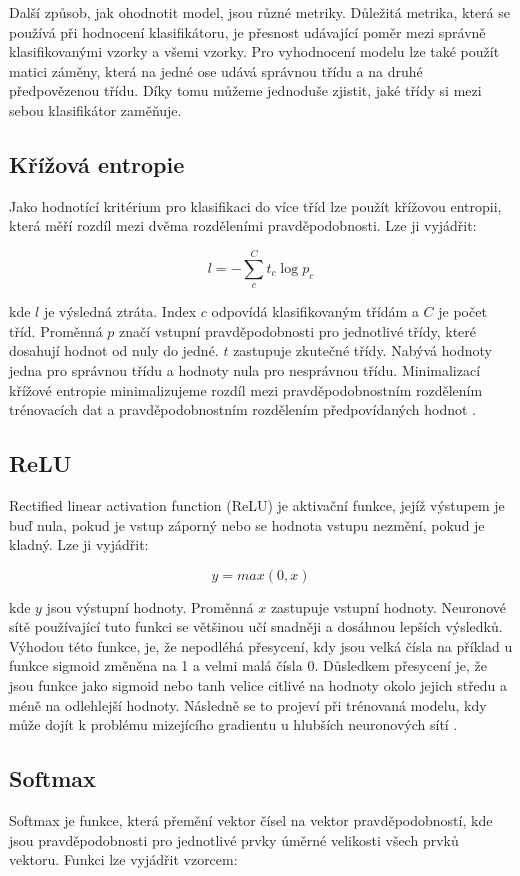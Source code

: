 \documentclass[FM,BP]{tulthesis}
\begin{document}
Další způsob, jak ohodnotit model, jsou různé metriky. Důležitá metrika, která se používá při hodnocení klasifikátoru, je přesnost udávající poměr mezi správně klasifikovanými vzorky a všemi vzorky. Pro vyhodnocení modelu lze také použít matici záměny, která na jedné ose udává správnou třídu a na druhé předpovězenou třídu. Díky tomu můžeme jednoduše zjistit, jaké třídy si mezi sebou klasifikátor zaměňuje.

\subsection{Křížová entropie}
Jako hodnotící kritérium pro klasifikaci do více tříd lze použít křížovou entropii, která měří rozdíl mezi dvěma rozděleními pravděpodobnosti. Lze ji vyjádřit:

$$ l = -{\sum_{c}^{C}t_{c}\log p_{c}} $$

kde $ l $ je výsledná ztráta. Index $ c $ odpovídá klasifikovaným třídám a $ C $ je počet tříd. Proměnná $ p $ značí vstupní pravděpodobnosti pro jednotlivé třídy, které dosahují hodnot od nuly do jedné. $ t $ zastupuje zkutečné třídy. Nabývá hodnoty jedna pro správnou třídu a hodnoty nula pro nesprávnou třídu. Minimalizací křížové entropie minimalizujeme rozdíl mezi pravděpodobnostním rozdělením trénovacích dat a pravděpodobnostním rozdělením předpovídaných hodnot \cite{brownlee_2020}.

\subsection{ReLU}
Rectified linear activation function (ReLU) je aktivační funkce, jejíž výstupem je buď nula, pokud je vstup záporný nebo se hodnota vstupu nezmění, pokud je kladný. Lze ji vyjádřit:

$$ y = max(0, x) $$

kde $ y $ jsou výstupní hodnoty. Proměnná $ x $ zastupuje vstupní hodnoty. Neuronové sítě používající tuto funkci se většinou učí snadněji a dosáhnou lepších výsledků. Výhodou této funkce, je, že nepodléhá přesycení, kdy jsou velká čísla na příklad u funkce sigmoid změněna na 1 a velmi malá čísla 0. Důsledkem přesycení je, že jsou funkce jako sigmoid nebo tanh velice citlivé na hodnoty okolo jejich středu a méně na odlehlejší hodnoty. Následně se to projeví při trénovaná modelu, kdy může dojít k problému mizejícího gradientu u hlubších neuronových sítí \cite{brownlee_2020_ReLU}.

\subsection{Softmax}
Softmax je funkce, která přemění vektor čísel na vektor pravděpodobností, kde jsou pravděpodobnosti pro jednotlivé prvky úměrné velikosti všech prvků vektoru. Funkci lze vyjádřit vzorcem:
\end{document}

